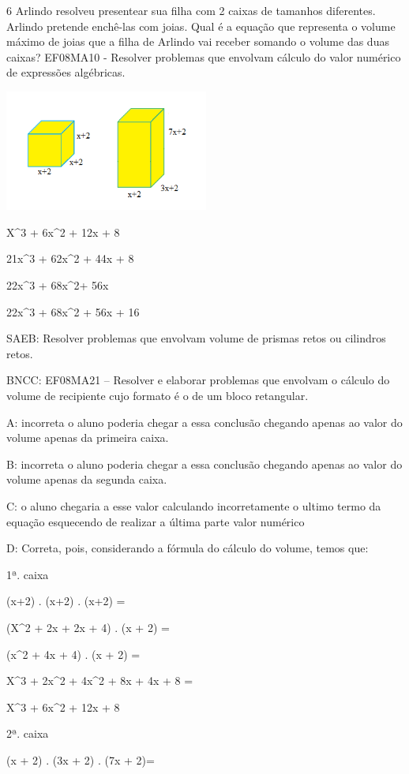 {\num{6} Arlindo resolveu presentear sua filha com 2 caixas de tamanhos
diferentes. Arlindo pretende enchê-las com joias. Qual é a equação que
representa o volume máximo de joias que a filha de Arlindo vai receber
somando o volume das duas caixas? EF08MA10 - Resolver problemas que
envolvam cálculo do valor numérico de expressões algébricas.

\includegraphics[width=2.63333in,height=1.56545in]{./imgSAEB_8_MAT/media/image55.png}
\item X^3 + 6x^2 + 12x + 8
\item 21x^3 + 62x^2 + 44x + 8
\item 22x^3 + 68x^2+ 56x
\item 22x^3 + 68x^2 + 56x + 16

SAEB: Resolver problemas que envolvam volume de prismas retos ou
cilindros retos.

BNCC: EF08MA21 -- Resolver e elaborar problemas que envolvam o cálculo
do volume de recipiente cujo formato é o de um bloco retangular.

A: incorreta o aluno poderia chegar a essa conclusão chegando apenas ao
valor do volume apenas da primeira caixa.

B: incorreta o aluno poderia chegar a essa conclusão chegando apenas ao
valor do volume apenas da segunda caixa.

C: o aluno chegaria a esse valor calculando incorretamente o ultimo
termo da equação esquecendo de realizar a última parte valor numérico

D: Correta, pois, considerando a fórmula do cálculo do volume, temos
que:

1ª. caixa

(x+2) . (x+2) . (x+2) =

(X^2 + 2x + 2x + 4) . (x + 2) =

(x^2 + 4x + 4) . (x + 2) =

X^3 + 2x^2 + 4x^2 + 8x + 4x + 8 =

X^3 + 6x^2 + 12x + 8

2ª. caixa

(x + 2) . (3x + 2) . (7x + 2)=

}
